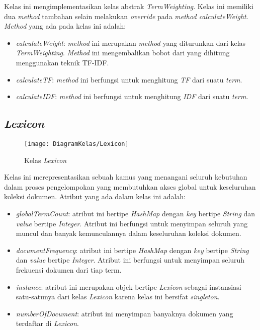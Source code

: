 Kelas ini mengimplementasikan kelas abstrak \textit{TermWeighting}. Kelas ini memiliki dua \textit{method} tambahan selain melakukan \textit{override} pada \textit{method calculateWeight}. \textit{Method} yang ada pada kelas ini adalah:

\begin{itemize}
	\item \textit{calculateWeight}: \textit{method} ini merupakan \textit{method} yang diturunkan dari kelas \textit{TermWeighting}. \textit{Method} ini mengembalikan bobot dari \term yang dihitung menggunakan teknik TF-IDF.
	\item \textit{calculateTF}: \textit{method} ini berfungsi untuk menghitung \textit{TF} dari suatu \textit{term}.
	\item \textit{calculateIDF}: \textit{method} ini berfungsi untuk menghitung \textit{IDF} dari suatu \textit{term}.
\end{itemize}

\subsection{\textit{Lexicon}}

\begin{figure}[H]
	\begin{center}
		\texttt{[image: DiagramKelas/Lexicon]}
		\caption{Kelas \textit{Lexicon}}
		\label{fig:kelasLexicon}
	\end{center}
\end{figure}

Kelas ini merepresentasikan sebuah kamus yang menangani seluruh kebutuhan dalam proses pengelompokan yang membutuhkan akses global untuk keseluruhan koleksi dokumen. Atribut yang ada dalam kelas ini adalah:

\begin{itemize}
	\item \textit{globalTermCount}: atribut ini bertipe \textit{HashMap} dengan \textit{key} bertipe \textit{String} dan \textit{value} bertipe \textit{Integer}. Atribut ini berfungsi untuk menyimpan seluruh \term yang muncul dan banyak kemunculannya dalam keseluruhan koleksi dokumen.
	\item \textit{documentFrequency}: atribut ini bertipe \textit{HashMap} dengan \textit{key} bertipe \textit{String} dan \textit{value} bertipe \textit{Integer}. Atribut ini berfungsi untuk menyimpan seluruh frekuensi dokumen dari tiap term.
	\item \textit{instance}: atribut ini merupakan objek bertipe \textit{Lexicon} sebagai instansiasi satu-satunya dari kelas \textit{Lexicon} karena kelas ini bersifat \textit{singleton}.
	\item \textit{numberOfDocument}: atribut ini menyimpan banyaknya dokumen yang terdaftar di \textit{Lexicon}. 
\end{itemize}

